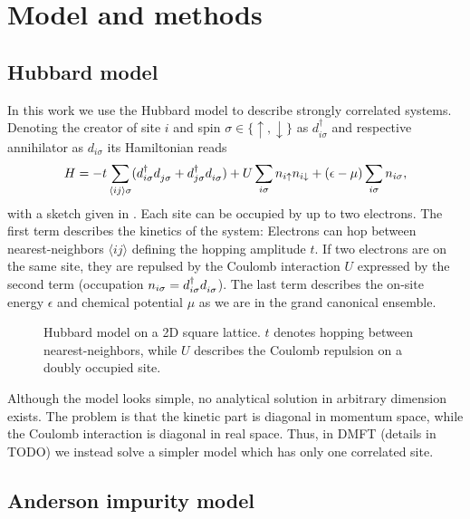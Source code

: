 
\chapter{Model and methods}

\section{Hubbard model}

In this work we use the Hubbard model \cite{Hubbard1997} to describe strongly correlated systems.
Denoting the creator of site $i$ and spin $\sigma\in\{\uparrow,\downarrow\}$
as $d^\dag_{i\sigma}$ and respective annihilator as $d_{i\sigma}$ its Hamiltonian reads
\begin{equation}
    H
    =
    -t\sum_{\langle i j\rangle\sigma}
    (d^\dag_{i\sigma} d^{\pdag}_{j\sigma} + d^\dag_{j\sigma} d^{\pdag}_{i\sigma})
    +
    U\sum_{i\sigma} n_{i\uparrow} n_{i\downarrow}
    +
    (\epsilon - \mu)\sum_{i\sigma} n_{i\sigma},
\end{equation}
with a sketch given in .
Each site can be occupied by up to two electrons.
The first term describes the kinetics of the system:
Electrons can hop between nearest-neighbors $\langle i j\rangle$
defining the hopping amplitude $t$.
If two electrons are on the same site, they are repulsed by the Coulomb interaction $U$
expressed by the second term (occupation $n_{i\sigma} = d^\dag_{i\sigma} d^{\pdag}_{i\sigma}$).
The last term describes the on-site energy $\epsilon$ and
chemical potential $\mu$ as we are in the grand canonical ensemble.

\begin{figure}[ht]
    \centering
    
    \caption{
        Hubbard model on a 2D square lattice.
        $t$ denotes hopping between nearest-neighbors,
        while $U$ describes the Coulomb repulsion on a doubly occupied site.
    }
    \label{fig:hubbard-model}
\end{figure}

Although the model looks simple, no analytical solution in arbitrary dimension exists.
The problem is that the kinetic part is diagonal in momentum space,
while the Coulomb interaction is diagonal in real space.
Thus, in DMFT (details in TODO) we instead solve a simpler model which has only one correlated site.

\section{Anderson impurity model}
\label{sec:anderson-impurity-model}

